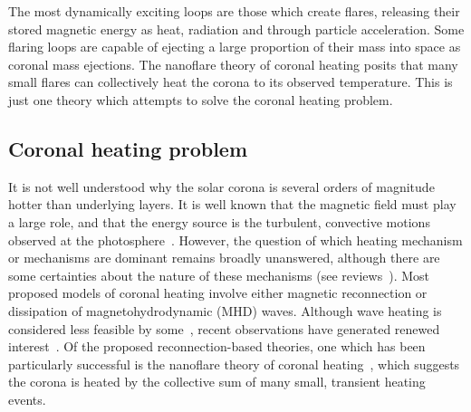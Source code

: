 The most dynamically exciting loops are those which create flares, releasing their stored magnetic energy as heat, radiation and through particle acceleration. Some flaring loops are capable of ejecting a large proportion of their mass into space as coronal mass ejections. The nanoflare theory of coronal heating posits that many small flares can collectively heat the corona to its observed temperature. This is just one theory which attempts to solve the coronal heating problem.

\subsection{Coronal heating problem}

It is not well understood why the solar corona is several orders of magnitude hotter than underlying layers. It is well known that the magnetic field must play a large role, and that the energy source is the turbulent, convective motions observed at the photosphere~\cite{browningMechanismsSolarCoronal1991}. However, the question of which heating mechanism or mechanisms are dominant remains broadly unanswered, although there are some certainties about the nature of these mechanisms (see reviews~\cite{demoortelRecentAdvancesCoronal2015,realeCoronalLoopsObservations2014}). Most proposed models of coronal heating involve either magnetic reconnection or dissipation of magnetohydrodynamic (MHD) waves. Although wave heating is considered less feasible by some~\cite{klimchukSolvingCoronalHeating2006a}, recent observations have generated renewed interest~\cite{hahnEvidenceWaveHeating2013,demoortelRecentAdvancesCoronal2015,mcintoshAlfvenicWavesSufficient2011,jessAlfvenWavesLower2009,depontieuChromosphericAlfvenicWaves2007}. Of the proposed reconnection-based theories, one which has been particularly successful is the nanoflare theory of coronal heating~\cite{1972
,klimchukSolvingCoronalHeating2006a}, which suggests the corona is heated by the collective sum of many small, transient heating events. 

